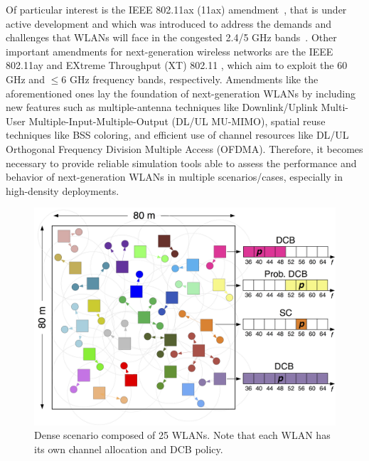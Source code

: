 \documentclass{article}
\begin{document}
	Of particular interest is the IEEE 802.11ax (11ax) amendment~\cite{tgax2017draft}, that is under active development and which was introduced to address the demands and challenges that WLANs will face in the congested 2.4/5 GHz bands~\cite{7422404_bellalta11ax}. Other important amendments for next-generation wireless networks are the IEEE 802.11ay \cite{ghasempour2017ieee} and EXtreme Throughput (XT) 802.11 \cite{xtreme_throughput}, which aim to exploit the 60 GHz and $\leq 6$ GHz frequency bands, respectively. Amendments like the aforementioned ones lay the foundation of next-generation WLANs by including new features such as multiple-antenna techniques like Downlink/Uplink Multi-User Multiple-Input-Multiple-Output (DL/UL MU-MIMO), spatial reuse techniques like BSS coloring, and efficient use of channel resources like DL/UL Orthogonal Frequency Division Multiple Access (OFDMA). Therefore, it becomes necessary to provide reliable simulation tools able to assess the performance and behavior of next-generation WLANs in multiple scenarios/cases, especially in high-density deployments.
	
	\begin{figure}[t]
		\centering	
		\includegraphics[width=0.75\columnwidth]{map_central.png}
		\caption{Dense scenario composed of 25 WLANs. Note that each WLAN has its own channel allocation and DCB policy.}
		\label{fig:map_dense}
	\end{figure}
	
\end{document}
